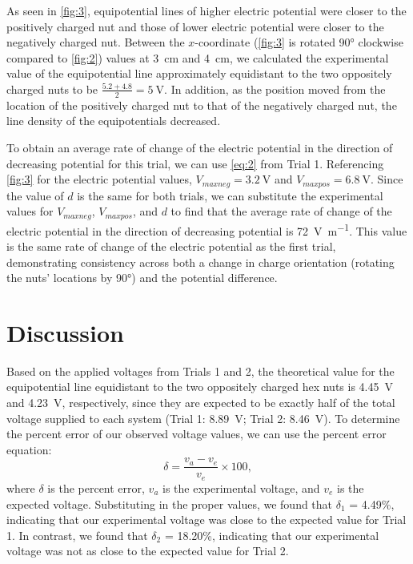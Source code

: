 \documentclass[10pt,journal,twoside]{IEEEtran}
\begin{document}
As seen in \cref{fig:3}, equipotential lines of higher electric potential were closer to the positively charged nut and those of lower electric potential were closer to the negatively charged nut. Between the $x$-coordinate (\cref{fig:3} is rotated \ang{90} clockwise compared to \cref{fig:2}) values at \qty{3}{\centi\meter} and \qty{4}{\centi\meter}, we calculated the experimental value of the equipotential line approximately equidistant to the two oppositely charged nuts to be $\frac{5.2+4.8}{2}=\qty{5}{\volt}$. In addition, as the position moved from the location of the positively charged nut to that of the negatively charged nut, the line density of the equipotentials decreased. 

To obtain an average rate of change of the electric potential in the direction of decreasing potential for this trial, we can use \cref{eq:2} from Trial 1. Referencing \cref{fig:3} for the electric potential values, $V_{maxneg} = \qty{3.2}{\volt}$ and $V_{maxpos} = \qty{6.8}{\volt}$. Since the value of $d$ is the same for both trials, we can substitute the experimental values for $V_{maxneg}$, $V_{maxpos}$, and $d$ to find that the average rate of change of the electric potential in the direction of decreasing potential is \qty{72}{\volt\per\meter}. This value is the same rate of change of the electric potential as the first trial, demonstrating consistency across both a change in charge orientation (rotating the nuts’ locations by \ang{90}) and the potential difference.






\section{Discussion}
Based on the applied voltages from Trials 1 and 2, the theoretical value for the equipotential line equidistant to the two oppositely charged hex nuts is \qty{4.45}{\volt} and \qty{4.23}{\volt}, respectively, since they are expected to be exactly half of the total voltage supplied to each system (Trial 1: \qty{8.89}{\volt}; Trial 2: \qty{8.46}{\volt}). To determine the percent error of our observed voltage values, we can use the percent error equation:
\begin{equation}
\delta = \frac{v_a - v_e}{v_e} \times 100,
\end{equation}
where $\delta$ is the percent error, $v_a$ is the experimental voltage, and $v_e$ is the expected voltage. Substituting in the proper values, we found that $\delta_1$ = 4.49\%, indicating that our experimental voltage was close to the expected value for Trial 1. In contrast, we found that $\delta_2$ = 18.20\%, indicating that our experimental voltage was not as close to the expected value for Trial 2.
\end{document}
